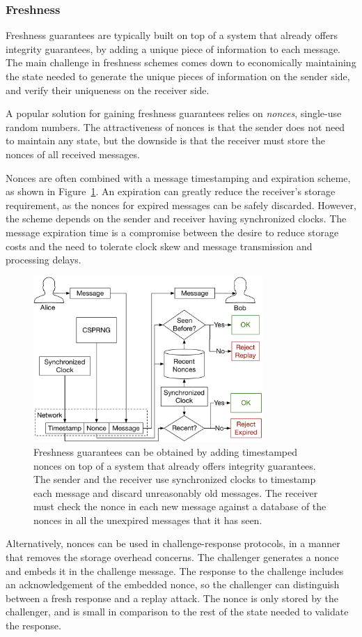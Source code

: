 \subsubsection{Freshness}

Freshness guarantees are typically built on top of a system that already offers
integrity guarantees, by adding a unique piece of information to each message.
The main challenge in freshness schemes comes down to economically maintaining
the state needed to generate the unique pieces of information on the sender
side, and verify their uniqueness on the receiver side.

A popular solution for gaining freshness guarantees relies on \textit{nonces},
single-use random numbers. The attractiveness of nonces is that the sender does
not need to maintain any state, but the downside is that the receiver must
store the nonces of all received messages.

Nonces are often combined with a message timestamping and expiration scheme, as
shown in Figure~\ref{fig:timestamped_nonces}. An expiration can greatly reduce
the receiver's storage requirement, as the nonces for expired messages can be
safely discarded. However, the scheme depends on the sender and receiver having
synchronized clocks. The message expiration time is a compromise between the
desire to reduce storage costs and the need to tolerate clock skew and
message transmission and processing delays.

\begin{figure}[hbt]
  \centering
  \includegraphics[width=87mm]{figures/timestamped_nonces.pdf}
  \caption{
    Freshness guarantees can be obtained by adding timestamped nonces on top
    of a system that already offers integrity guarantees. The sender and the
    receiver use synchronized clocks to timestamp each message and discard
    unreasonably old messages. The receiver must check the nonce in each new
    message against a database of the nonces in all the unexpired messages that
    it has seen.
  }
  \label{fig:timestamped_nonces}
\end{figure}

Alternatively, nonces can be used in challenge-response protocols, in a manner
that removes the storage overhead concerns. The challenger generates a nonce
and embeds it in the challenge message. The response to the challenge includes
an acknowledgement of the embedded nonce, so the challenger can distinguish
between a fresh response and a replay attack. The nonce is only stored by the
challenger, and is small in comparison to the rest of the state needed to
validate the response.

